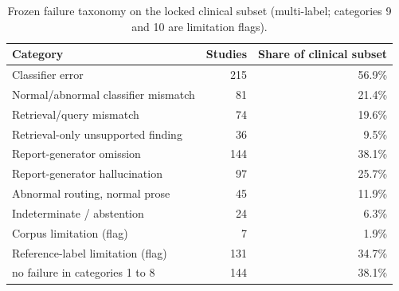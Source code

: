 \begin{table}[t]
\centering
\scriptsize
\begin{tabular}{lrr}
\hline
Category & Studies & Share of clinical subset \\
\hline
Classifier error & 215 & 56.9\% \\
Normal/abnormal classifier mismatch & 81 & 21.4\% \\
Retrieval/query mismatch & 74 & 19.6\% \\
Retrieval-only unsupported finding & 36 & 9.5\% \\
Report-generator omission & 144 & 38.1\% \\
Report-generator hallucination & 97 & 25.7\% \\
Abnormal routing, normal prose & 45 & 11.9\% \\
Indeterminate / abstention & 24 & 6.3\% \\
Corpus limitation (flag) & 7 & 1.9\% \\
Reference-label limitation (flag) & 131 & 34.7\% \\
no failure in categories 1 to 8 & 144 & 38.1\% \\
\hline
\end{tabular}
\caption{Frozen failure taxonomy on the locked clinical subset (multi-label; categories 9 and 10 are limitation flags).}
\label{tab:table9_failure_analysis}
\end{table}
